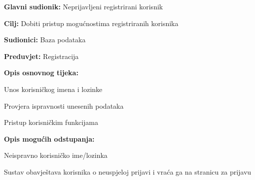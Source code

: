 					\noindent {}
					\begin{packed_item}
	
						\item \textbf{Glavni sudionik:} Neprijavljeni registrirani korisnik
						\item  \textbf{Cilj:} Dobiti pristup mogućnostima registriranih korisnika
						\item  \textbf{Sudionici:} Baza podataka
						\item  \textbf{Preduvjet:} Registracija
						\item  \textbf{Opis osnovnog tijeka:}
						
						\item[] \begin{packed_enum}
	
							\item Unos korisničkog imena i lozinke
							\item Provjera ispravnosti unesenih podataka
							\item Pristup korisničkim funkcijama
						\end{packed_enum}
						
						\item  \textbf{Opis mogućih odstupanja:}
						
						\item[] \begin{packed_item}
	
							\item[2.a] Neispravno korisničko ime/lozinka
							\item[] \begin{packed_enum}
								
								\item Sustav obavještava korisnika o neuspjeloj prijavi i vraća ga na stranicu za prijavu
								
							\end{packed_enum}
							
						\end{packed_item}
					\end{packed_item}
					
